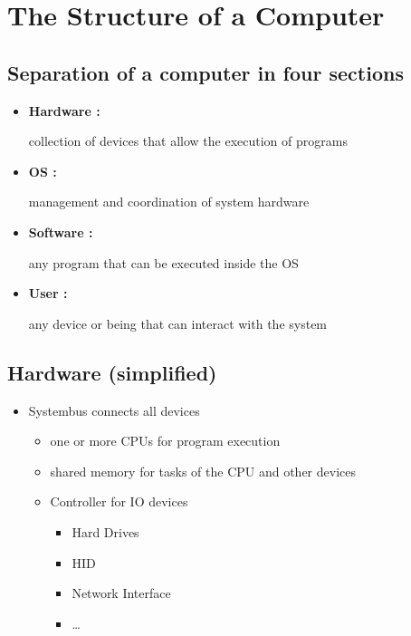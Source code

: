 \documentclass[
]{article}
\author{}
\date{}
\providecommand{\tightlist}{%
  \setlength{\itemsep}{0pt}\setlength{\parskip}{0pt}}
\begin{document}
\hypertarget{the-structure-of-a-computer}{%
\section{The Structure of a
Computer}\label{the-structure-of-a-computer}}

\hypertarget{separation-of-a-computer-in-four-sections}{%
\subsection{Separation of a computer in four
sections}\label{separation-of-a-computer-in-four-sections}}

\begin{itemize}
\item
  \textbf{Hardware :}

  collection of devices that allow the execution of programs
\item
  \textbf{OS :}

  management and coordination of system hardware
\item
  \textbf{Software :}

  any program that can be executed inside the OS
\item
  \textbf{User :}

  any device or being that can interact with the system
\end{itemize}

\hypertarget{hardware-simplified}{%
\subsection{Hardware (simplified)}\label{hardware-simplified}}

\begin{itemize}
\tightlist
\item
  Systembus connects all devices

  \begin{itemize}
  \tightlist
  \item
    one or more CPUs for program execution
  \item
    shared memory for tasks of the CPU and other devices
  \item
    Controller for IO devices

    \begin{itemize}
    \tightlist
    \item
      Hard Drives
    \item
      HID
    \item
      Network Interface
    \item
      \ldots{}
    \end{itemize}
  \end{itemize}
\end{itemize}
\end{document}
